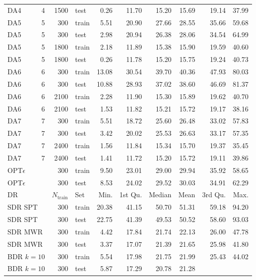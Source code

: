 \begin{table}[ht]
\begin{tabular}{lrrlrrrrrr}
  DA4 & 4 & 1500 & test & 0.26 & 11.70 & 15.20 & 15.69 & 19.14 & 37.99 \\ 
  DA5 & 5 & 300 & train & 5.51 & 20.90 & 27.66 & 28.55 & 35.66 & 59.68 \\ 
  DA5 & 5 & 300 & test & 2.98 & 20.94 & 26.38 & 28.06 & 34.54 & 64.99 \\ 
  DA5 & 5 & 1800 & train & 2.18 & 11.89 & 15.38 & 15.90 & 19.59 & 40.60 \\ 
  DA5 & 5 & 1800 & test & 0.26 & 11.78 & 15.20 & 15.75 & 19.24 & 40.73 \\ 
  DA6 & 6 & 300 & train & 13.08 & 30.54 & 39.70 & 40.36 & 47.93 & 80.03 \\ 
  DA6 & 6 & 300 & test & 10.88 & 28.93 & 37.02 & 38.60 & 46.69 & 81.37 \\ 
  DA6 & 6 & 2100 & train & 2.28 & 11.90 & 15.30 & 15.89 & 19.62 & 40.70 \\ 
  DA6 & 6 & 2100 & test & 1.53 & 11.82 & 15.21 & 15.72 & 19.17 & 38.16 \\ 
  DA7 & 7 & 300 & train & 5.51 & 18.72 & 25.60 & 26.48 & 33.02 & 57.83 \\ 
  DA7 & 7 & 300 & test & 3.42 & 20.02 & 25.53 & 26.63 & 33.17 & 57.35 \\ 
  DA7 & 7 & 2400 & train & 1.56 & 11.84 & 15.34 & 15.70 & 19.37 & 35.45 \\ 
  DA7 & 7 & 2400 & test & 1.41 & 11.72 & 15.20 & 15.72 & 19.11 & 39.86 \\ 
  OPT$\epsilon$ & & 300 & train & 9.50 & 23.01 & 29.00 & 29.94 & 35.92 & 
  58.65 \\ 
  OPT$\epsilon$ & & 300 & test & 8.53 & 24.02 & 29.52 & 30.03 & 34.91 & 
  62.29 \\ 
  \midrule
  DR & & $N_{\text{train}}$ & Set & Min. & 1st Qu. & Median & Mean & 
    3rd Qu. & Max. \\ 
    \midrule
  \multicolumn{2}{l}{SDR SPT} & 300 & train & 20.38 & 41.15 & 50.70 & 51.31 & 
  59.18 & 94.20 \\ 
  \multicolumn{2}{l}{SDR SPT} & 300 & test & 22.75 & 41.39 & 49.53 & 50.52 & 
  58.60 & 93.03 \\ 
  \multicolumn{2}{l}{SDR MWR} & 300 & train & 4.42 & 17.84 & 21.74 & 22.13 & 
  26.00 & 47.78 \\ 
  \multicolumn{2}{l}{SDR MWR} & 300 & test & 3.37 & 17.07 & 21.39 & 21.65 & 
  25.98 & 41.80 \\ 
  \multicolumn{2}{l}{BDR $k=10$} & 300 & train & 5.54 & 17.98 & 21.75 & 21.99 & 
  25.43 & 44.02 \\ 
  \multicolumn{2}{l}{BDR $k=10$} & 300 & test & 5.87 & 17.29 & 20.78 & 21.28 & 

\end{tabular}
\end{table}
